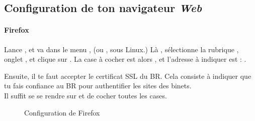 
\subsection{Configuration de ton navigateur \emph{Web}}
\label{browser}

\paragraph{Firefox}

Lance , et va dans le menu ,
 (ou ,  sous Linux.) L\`a , s\'electionne la rubrique , onglet , et clique sur
. La case \`a  cocher est alors ,
et l'adresse \`a  indiquer est : .

Ensuite, il te faut accepter le certificat SSL du BR. Cela consiste \`a indiquer que tu fais confiance au BR pour authentifier les sites des binets.\\
Il suffit se se rendre sur  et de cocher toutes les cases.\\

\noindent
  \begin{figure}[!h]
    \begin{center}  
           \caption{Configuration de Firefox}
    \end{center}
  \end{figure}
%

